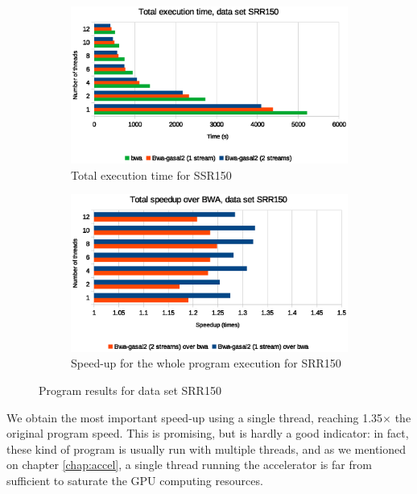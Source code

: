 \begin{figure}[p]
	\centering
	\begin{subfigure}[t]{1\textwidth}
		\centering
			\includegraphics[width=1\textwidth]{srr150/total-exec-time-srr150}
		\caption{Total execution time for SSR150}
		\label{fig:total-exec-time-srr150}
	\end{subfigure}%
	
	\begin{subfigure}[b]{1\textwidth}
		\centering
		\includegraphics[width=1\textwidth]{srr150/total-exec-speed-up-srr150}
		\caption{Speed-up for the whole program execution for SRR150}
		\label{fig:total-exec-speed-up-srr150}
	\end{subfigure}
	\caption{Program results for data set SRR150}
\end{figure}


We obtain the most important speed-up using a single thread, reaching 1.35$\times$ the original program speed. This is promising, but is hardly a good indicator: in fact, these kind of program is usually run with multiple threads, and as we mentioned on chapter \ref{chap:accel}, a single thread running the accelerator is far from sufficient to saturate the GPU computing resources.


